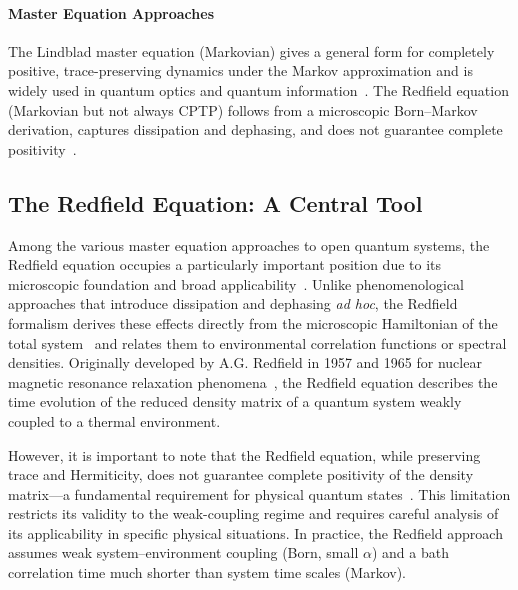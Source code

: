 \paragraph{Master Equation Approaches}

\noindent
The Lindblad master equation (Markovian) gives a general form for completely positive, trace-preserving dynamics under the Markov approximation and is widely used in quantum optics and quantum information~\cite{breuerpetruccione2009theoryopenquantum, lindblad1976generatorsquantumdynamical}. The Redfield equation (Markovian but not always CPTP) follows from a microscopic Born–Markov derivation, captures dissipation and dephasing, and does not guarantee complete positivity~\cite{redfield1965theoryrelaxationprocesses, rivasetal2014quantumnonmarkovianitycharacterization, lietal2018conceptsquantumnonmarkovianity}.


\subsection{The Redfield Equation: A Central Tool}

\noindent
Among the various master equation approaches to open quantum systems, the Redfield equation occupies a particularly important position due to its microscopic foundation and broad applicability~\cite{redfield1965theoryrelaxationprocesses, breuerpetruccione2009theoryopenquantum}.
Unlike phenomenological approaches that introduce dissipation and dephasing \emph{ad hoc}, the Redfield formalism derives these effects directly from the microscopic Hamiltonian of the total system~\cite{breuerpetruccione2009theoryopenquantum, weiss2012quantumdissipativesystems} and
relates them to environmental correlation functions or spectral densities.
Originally developed by A.G. Redfield in 1957 and 1965 for nuclear magnetic resonance relaxation phenomena~\cite{redfield1965theoryrelaxationprocesses}, the Redfield equation describes the time evolution of the reduced density matrix of a quantum system weakly coupled to a thermal environment.

\noindent
However, it is important to note that the Redfield equation, while preserving trace and Hermiticity, does not guarantee complete positivity of the density matrix—a fundamental requirement for physical quantum states~\cite{rivasetal2010markovianmasterequations}. This limitation restricts its validity to the weak-coupling regime and requires careful analysis of its applicability in specific physical situations. In practice, the Redfield approach assumes weak system--environment coupling (Born, small $\alpha$) and a bath correlation time much shorter than system time scales (Markov).

